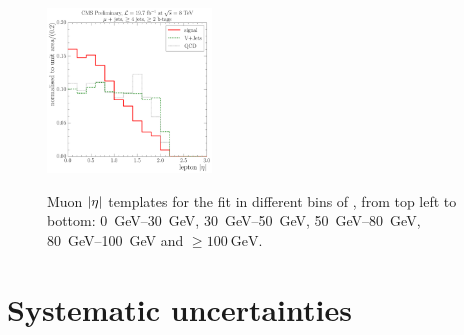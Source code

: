 \begin{figure}[!htbp]
    \hspace*{\fill} \\
    \hspace*{\fill}
    {\includegraphics[width=0.39\textwidth]{measurement/MT/central/fit_templates/muon_templates_bin_100-inf}}
    \hspace*{\fill}
    \caption[Muon $\abs \eta$ templates for the fit in different bins of \MT]{Muon $\abs \eta$ templates for the fit in
    different bins of \MT, from top left to bottom: \SIrange{0}{30}{\GeV}, \SIrange{30}{50}{\GeV},
    \SIrange{50}{80}{\GeV}, \SIrange{80}{100}{\GeV} and $\geq \SI{100}{\GeV}$.}
    \label{fig:fit_templates_MT_muon}
\end{figure}


\chapter{Systematic uncertainties}
\label{a:xsection_systematics_tables}






